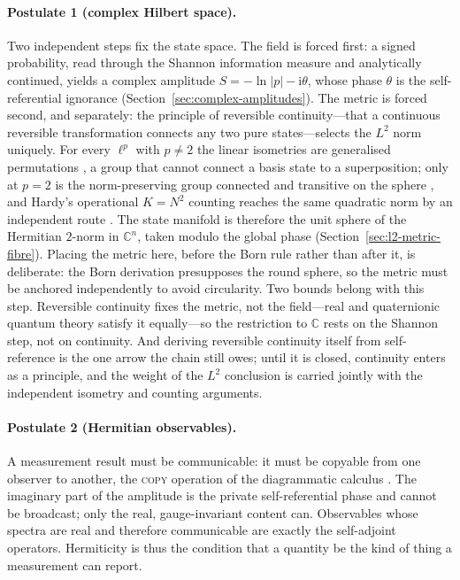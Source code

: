 \documentclass{article}
\begin{document}
\paragraph{Postulate 1 (complex Hilbert space).}
Two independent steps fix the state space. The field is forced first: a signed
probability, read through the Shannon information measure and analytically
continued, yields a complex amplitude $S=-\ln\lvert p\rvert-\mathrm{i}\theta$,
whose phase $\theta$ is the self-referential ignorance
(Section~\ref{sec:complex-amplitudes}). The metric is forced second, and
separately: the principle of reversible continuity---that a continuous reversible
transformation connects any two pure states---selects the $L^{2}$ norm uniquely.
For every $\ell^{p}$ with $p\neq 2$ the linear isometries are generalised
permutations \autocite{Banach1932, Lamperti1958}, a group that cannot connect a
basis state to a superposition; only at $p=2$ is the norm-preserving group
connected and transitive on the sphere \autocite{Aaronson2004h}, and Hardy's
operational $K=N^{2}$ counting reaches the same quadratic norm by an independent
route \autocite{Hardy2001a}. The state manifold is therefore the unit sphere of the
Hermitian $2$-norm in $\mathbb{C}^{n}$, taken modulo the global phase
(Section~\ref{sec:l2-metric-fibre}). Placing the metric here, before the Born
rule rather than after it, is deliberate: the Born derivation presupposes the
round sphere, so the metric must be anchored independently to avoid circularity.
Two bounds belong with this step. Reversible continuity fixes the metric, not the
field---real and quaternionic quantum theory satisfy it equally---so the
restriction to $\mathbb{C}$ rests on the Shannon step, not on continuity. And
deriving reversible continuity itself from self-reference is the one arrow the
chain still owes; until it is closed, continuity enters as a principle, and the
weight of the $L^{2}$ conclusion is carried jointly with the independent
isometry and counting arguments.

\paragraph{Postulate 2 (Hermitian observables).}
A measurement result must be communicable: it must be copyable from one observer
to another, the \textsc{copy} operation of the diagrammatic calculus
\autocite{CoeckeKissinger2017}. The imaginary part of the amplitude is the
private self-referential phase and cannot be broadcast; only the real,
gauge-invariant content can. Observables whose spectra are real and therefore
communicable are exactly the self-adjoint operators. Hermiticity is thus the
condition that a quantity be the kind of thing a measurement can report.
\end{document}
